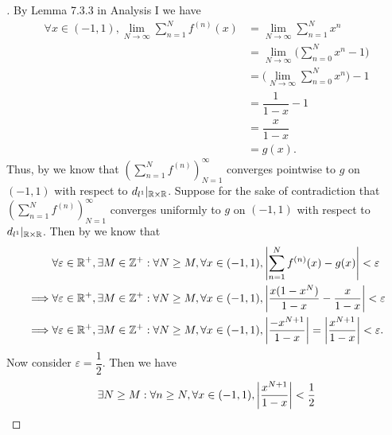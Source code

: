 \begin{proof}[]
  By Lemma 7.3.3 in Analysis I we have
  \begin{align*}
    \forall x \in (-1, 1), \lim_{N \to \infty} \sum_{n = 1}^N f^{(n)}(x) & = \lim_{N \to \infty} \sum_{n = 1}^N x^n                 \\
                                                                         & = \lim_{N \to \infty} \bigg(\sum_{n = 0}^N x^n - 1\bigg) \\
                                                                         & = \bigg(\lim_{N \to \infty} \sum_{n = 0}^N x^n\bigg) - 1 \\
                                                                         & = \dfrac{1}{1 - x} - 1                                   \\
                                                                         & = \dfrac{x}{1 - x}                                       \\
                                                                         & = g(x).
  \end{align*}
  Thus, by  we know that \((\sum_{n = 1}^N f^{(n)})_{N = 1}^\infty\) converges pointwise to \(g\) on \((-1, 1)\) with respect to \(d_{l^1}|_{\mathbb{R} \times \mathbb{R}}\).
  Suppose for the sake of contradiction that \((\sum_{n = 1}^N f^{(n)})_{N = 1}^\infty\) converges uniformly to \(g\) on \((-1, 1)\) with respect to \(d_{l^1}|_{\mathbb{R} \times \mathbb{R}}\).
  Then by  we know that
  \begin{align*}
             & \forall \varepsilon \in \mathbb{R}^+, \exists M \in \mathbb{Z}^+ : \forall N \geq M, \forall x \in (-1, 1), \left\lvert\sum_{n = 1}^N f^{(n)}(x) - g(x)\right\rvert < \varepsilon                            \\
    \implies & \forall \varepsilon \in \mathbb{R}^+, \exists M \in \mathbb{Z}^+ : \forall N \geq M, \forall x \in (-1, 1), \left\lvert\dfrac{x(1 - x^N)}{1 - x} - \dfrac{x}{1 - x}\right\rvert < \varepsilon                \\
    \implies & \forall \varepsilon \in \mathbb{R}^+, \exists M \in \mathbb{Z}^+ : \forall N \geq M, \forall x \in (-1, 1), \left\lvert\dfrac{-x^{N + 1}}{1 - x}\right\rvert = \left\lvert\dfrac{x^{N + 1}}{1 - x}\right\rvert < \varepsilon.
  \end{align*}
  Now consider \(\varepsilon = \dfrac{1}{2}\).
  Then we have
  \begin{align*}
             & \exists N \geq M : \forall n \geq N, \forall x \in (-1, 1), \abs{\dfrac{x^{N + 1}}{1 - x}} < \dfrac{1}{2}                                                                       \\

\end{align*}
\end{proof}
